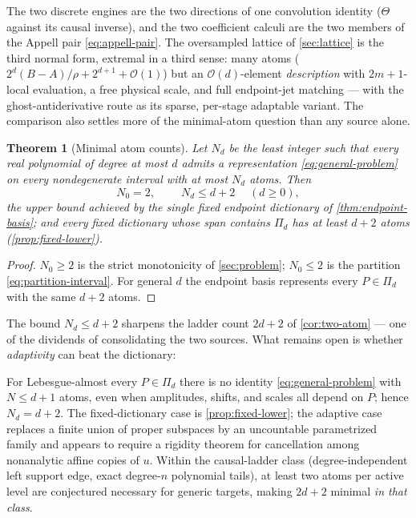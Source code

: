 \documentclass[11pt,oneside]{article}
\numberwithin{equation}{section}
\newtheorem{theorem}{Theorem}[section]
\theoremstyle{definition}
\theoremstyle{remark}
\newcommand{\bigO}{\mathcal O}
\newcommand{\ThetaTM}{\Theta}
\newcommand{\PiD}{\Pi_d}
\begin{document}
The two discrete engines are the two directions of one convolution
identity ($\ThetaTM$ against its causal inverse), and the two
coefficient calculi are the two members of the Appell pair
\eqref{eq:appell-pair}.  The oversampled lattice of
\cref{sec:lattice} is the third normal form, extremal in a third
sense: many atoms ($2^{d}(B-A)/\rho+2^{d+1}+\bigO(1)$) but an
$\bigO(d)$-element \emph{description} with $2m+1$-local
evaluation, a free physical scale, and full endpoint-jet matching
--- with the ghost-antiderivative route as its sparse, per-stage
adaptable variant.  The comparison also settles more of the
minimal-atom question than any source alone.

\begin{theorem}[Minimal atom counts]
\label{thm:minimal-atoms}
Let $N_d$ be the least integer such that \emph{every} real polynomial
of degree at most $d$ admits a representation
\eqref{eq:general-problem} on every nondegenerate interval with at
most $N_d$ atoms.  Then
\begin{equation}
 N_0=2,
 \qquad
 \boxed{\;N_d\le d+2\;}
 \quad(d\ge0),
 \label{eq:Nd-bounds}
\end{equation}
the upper bound achieved by the single fixed endpoint dictionary of
\cref{thm:endpoint-basis}; and every \emph{fixed} dictionary whose
span contains $\PiD$ has at least $d+2$ atoms
(\cref{prop:fixed-lower}).
\end{theorem}

\begin{proof}
$N_0\ge2$ is the strict monotonicity of \cref{sec:problem};
$N_0\le2$ is the partition \eqref{eq:partition-interval}.  For
general $d$ the endpoint basis represents every $P\in\PiD$ with the
same $d+2$ atoms.
\end{proof}

The bound $N_d\le d+2$ sharpens the ladder count $2d+2$ of
\cref{cor:two-atom} --- one of the dividends of consolidating the two
sources.  What remains open is whether \emph{adaptivity} can beat the
dictionary:

\begin{conjecture}
\label{conj:adaptive-rigidity}
For Lebesgue-almost every $P\in\PiD$ there is no identity
\eqref{eq:general-problem} with $N\le d+1$ atoms, even when
amplitudes, shifts, and scales all depend on $P$; hence
$N_d=d+2$.  The fixed-dictionary case is
\cref{prop:fixed-lower}; the adaptive case replaces a finite union of
proper subspaces by an uncountable parametrized family and appears to
require a rigidity theorem for cancellation among nonanalytic affine
copies of $u$.  Within the causal-ladder class (degree-independent
left support edge, exact degree-$n$ polynomial tails), at least two
atoms per active level are conjectured necessary for generic targets,
making $2d+2$ minimal \emph{in that class}.
\end{conjecture}
\end{document}

